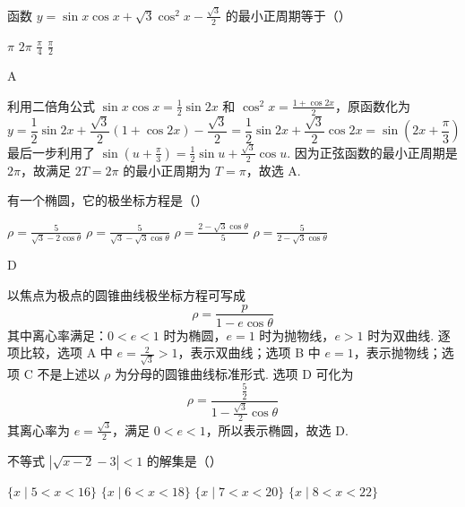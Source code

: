 \begin{problem}
函数 \(y=\sin x\cos x+\sqrt{3}\cos^2 x-\frac{\sqrt{3}}{2}\) 的最小正周期等于（\quad）

\choices
    {\(\pi\)}
    {\(2\pi\)}
    {\(\frac{\pi}{4}\)}
    {\(\frac{\pi}{2}\)}
\end{problem}

\begin{answer}
A
\end{answer}

\begin{solution}
利用二倍角公式 \(\sin x\cos x=\frac12\sin 2x\) 和 \(\cos^2x=\frac{1+\cos 2x}{2}\)，原函数化为
\[
y=\frac12\sin2x+\frac{\sqrt{3}}{2}(1+\cos2x)-\frac{\sqrt{3}}2
=\frac12\sin2x+\frac{\sqrt{3}}2\cos2x
=\sin\left(2x+\frac{\pi}{3}\right)
\]
最后一步利用了 \(\sin(u+\frac\pi3)=\frac12\sin u+\frac{\sqrt3}{2}\cos u\). 因为正弦函数的最小正周期是 \(2\pi\)，故满足 \(2T=2\pi\) 的最小正周期为 \(T=\pi\)，故选 A.
\end{solution}

\begin{problem}
有一个椭圆，它的极坐标方程是（\quad）

\choices
    {\(\rho=\frac{5}{\sqrt{3}-2\cos\theta}\)}
    {\(\rho=\frac{5}{\sqrt{3}-\sqrt{3}\cos\theta}\)}
    {\(\rho=\frac{2-\sqrt{3}\cos\theta}{5}\)}
    {\(\rho=\frac{5}{2-\sqrt{3}\cos\theta}\)}
\end{problem}

\begin{answer}
D
\end{answer}

\begin{solution}
以焦点为极点的圆锥曲线极坐标方程可写成
\[
\rho=\frac{p}{1-e\cos\theta}
\]
其中离心率满足：\(0<e<1\) 时为椭圆，\(e=1\) 时为抛物线，\(e>1\) 时为双曲线. 逐项比较，选项 A 中 \(e=\frac{2}{\sqrt3}>1\)，表示双曲线；选项 B 中 \(e=1\)，表示抛物线；选项 C 不是上述以 \(\rho\) 为分母的圆锥曲线标准形式. 选项 D 可化为
\[
\rho=\frac{\frac{5}{2}}{1-\frac{\sqrt{3}}2\cos\theta}
\]
其离心率为 \(e=\frac{\sqrt3}{2}\)，满足 \(0<e<1\)，所以表示椭圆，故选 D.
\end{solution}

\begin{problem}
不等式 \(\left| \sqrt{x-2}-3 \right|<1\) 的解集是（\quad）

\choices
    {\(\{x\mid 5<x<16\}\)}
    {\(\{x\mid 6<x<18\}\)}
    {\(\{x\mid 7<x<20\}\)}
    {\(\{x\mid 8<x<22\}\)}
\end{problem}

